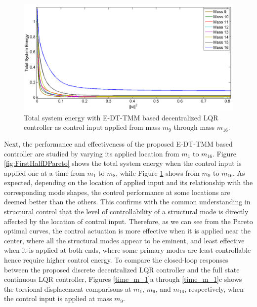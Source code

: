 \documentclass[11pt]{ucthesis}
\begin{document}
\begin{figure}[thpb]
\centering
\includegraphics[width=1\linewidth]{Figures/SecondHalfPareto.png}
\caption{Total system energy with E-DT-TMM based decentralized LQR controller as control input applied from mass $m_9$ through mass $m_{16}$. }
\label{fig:SecHalfDPareto}
\end{figure}

Next, the performance and effectiveness of the proposed E-DT-TMM based controller are studied by varying its applied location from $m_1$ to $m_{16}$. Figure \ref{fig:FirstHalfDPareto} shows the total system energy when the control input is applied one at a time from $m_1$ to $m_8$, while Figure \ref{fig:SecHalfDPareto} shows from $m_9$ to $m_{16}$. As expected, depending on the location of applied input and its relationship with the corresponding mode shapes, the control performance at some locations are deemed better than the others. This confirms with the common understanding in structural control that the level of controllability of a structural mode is directly affected by the location of control input. Therefore, as we can see from the Pareto optimal curves, the control actuation is more effective when it is applied near the center, where all the structural modes appear to be eminent, and least effective when it is applied at both ends, where some primary modes are least controllable hence require higher control energy. To compare the closed-loop responses between the proposed discrete decentralized LQR controller and the full state continuous LQR controller, Figures \ref{time_m_1}a through \ref{time_m_1}c shows the torsional displacement comparisons at $m_1$, $m_9$, and $m_{16}$, respectively, when the control input is applied at mass $m_9$.
\end{document}
